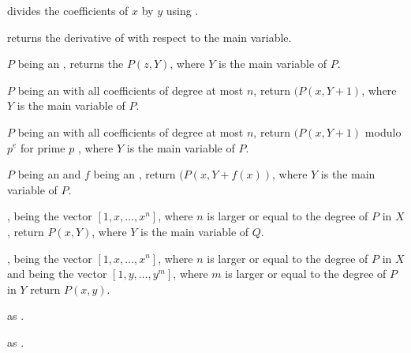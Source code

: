 
 divides the coefficients of $x$
by $y$ using .


 returns the derivative of  with
respect to the main variable.



 $P$ being an , returns
the  $P(z,Y)$, where $Y$ is the main variable of $P$.


 $P$ being an  with
all coefficients of degree at most $n$, return $(P(x,Y+1)$, where $Y$ is the
main variable of $P$.

$P$ being an  with all coefficients of degree at most $n$, return
$(P(x,Y+1)$  modulo $p^e$ for prime $p$ , where $Y$ is the main variable of
$P$.

 $P$ being an 
and $f$ being an , return $(P(x,Y+f(x))$, where $Y$ is the main
variable of $P$.

, 
being the vector $[1,x,\dots,x^n]$, where $n$ is larger or equal to the degree
of $P$ in $X$, return $P(x,Y)$, where $Y$ is the main variable of $Q$.

,
 being the vector $[1,x,\dots,x^n]$, where $n$ is larger or equal to
the degree of $P$ in $X$ and  being the vector $[1,y,\dots,y^m]$,
where $m$ is larger or equal to the degree of $P$ in $Y$ return $P(x,y)$.

 as
.


 as
.

